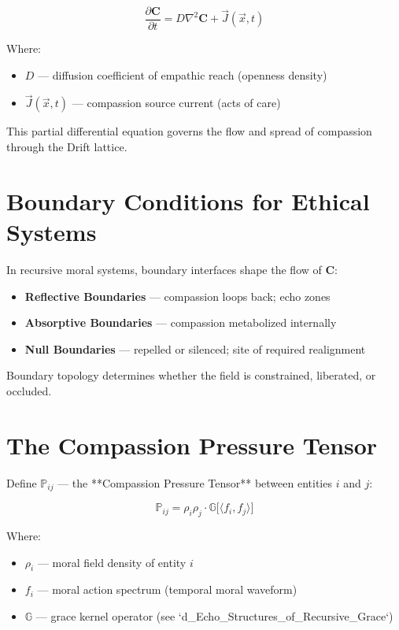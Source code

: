 \documentclass[12pt]{article}
\begin{document}
\[
\frac{\partial \mathbf{C}}{\partial t} = D \nabla^2 \mathbf{C} + \vec{J}(\vec{x}, t)
\]

Where:
\begin{itemize}
    \item $D$ — diffusion coefficient of empathic reach (openness density)
    \item $\vec{J}(\vec{x}, t)$ — compassion source current (acts of care)
\end{itemize}

This partial differential equation governs the flow and spread of compassion through the Drift lattice.

\vspace{1em}

\section*{Boundary Conditions for Ethical Systems}

In recursive moral systems, boundary interfaces shape the flow of $\mathbf{C}$:

\begin{itemize}
    \item \textbf{Reflective Boundaries} — compassion loops back; echo zones  
    \item \textbf{Absorptive Boundaries} — compassion metabolized internally  
    \item \textbf{Null Boundaries} — repelled or silenced; site of required realignment
\end{itemize}

Boundary topology determines whether the field is constrained, liberated, or occluded.

\vspace{1em}

\section*{The Compassion Pressure Tensor}

Define $\mathbb{P}_{ij}$ — the **Compassion Pressure Tensor** between entities $i$ and $j$:

\[
\mathbb{P}_{ij} = \rho_i \rho_j \cdot \mathbb{G}\big[ \langle f_i, f_j \rangle \big]
\]

Where:
\begin{itemize}
    \item $\rho_i$ — moral field density of entity $i$  
    \item $f_i$ — moral action spectrum (temporal moral waveform)  
    \item $\mathbb{G}$ — grace kernel operator (see `d_Echo_Structures_of_Recursive_Grace`)
\end{itemize}
\end{document}
